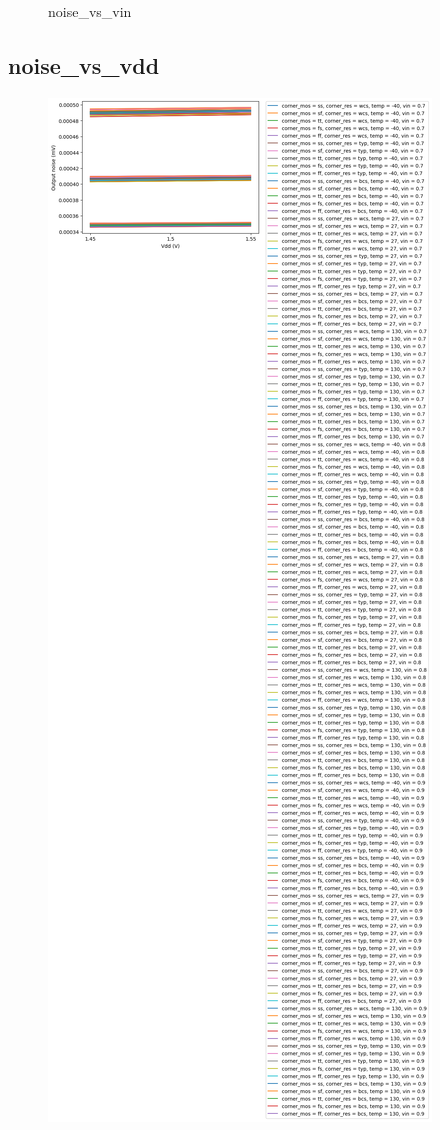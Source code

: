 \documentclass[
  a4paper,
  DIV=11,
  numbers=noendperiod]{scrartcl}
\begin{document}
\begin{tcolorbox}
\begin{figure}[H]
{}

\caption{noise\_vs\_vin}

\end{figure}%

\subsection*{noise\_vs\_vdd}\label{noise_vs_vdd-1}

\begin{figure}[H]

{\centering \includegraphics{./cace/_docs/ota-improved/schematic/noise_vs_vdd.png}

}
\end{figure}
\end{tcolorbox}
\end{document}
